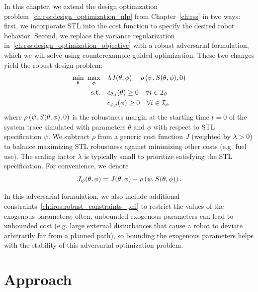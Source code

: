 In this chapter, we extend the design optimization problem~\eqref{ch:rss:design_optimization_nlp} from Chapter~\ref{ch:rss} in two ways: first, we incorporate STL into the cost function to specify the desired robot behavior. Second, we replace the variance regularization in~\eqref{ch:rss:design_optimization_objective} with a robust adversarial formulation, which we will solve using counterexample-guided optimization. These two changes yield the robust design problem:
%
\begin{subequations}\label{ch:iros:robust_nlp_generic}
	\begin{align}
		\min_\theta\ \max_\phi & \quad \lambda J(\theta, \phi) - \rho\left( \psi, S(\theta, \phi), 0 \right)  \label{ch:iros:robust_objective_generic}          \\
		\text{s.t.}            & \quad c_{\theta, i}(\theta) \geq 0 \quad \forall i \in \mathcal{I}_{\theta} \label{ch:iros:robust_constraints_theta} \\
		                       & \quad c_{\phi, i}(\phi) \geq 0 \quad \forall i \in \mathcal{I}_{\phi} \label{ch:iros:robust_constraints_phi}
	\end{align}
\end{subequations}
%
where $\rho\left( \psi, S(\theta, \phi), 0 \right)$ is the robustness margin at the starting time $t=0$ of the system trace simulated with parameters $\theta$ and $\phi$ with respect to STL specification $\psi$. We subtract $\rho$ from a generic cost function $J$ (weighted by $\lambda > 0$) to balance maximizing STL robustness against minimizing other costs (e.g. fuel use). The scaling factor $\lambda$ is typically small to prioritize satisfying the STL specification. For convenience, we denote
\begin{equation}
	J_\psi(\theta, \phi) = J(\theta, \phi) - \rho\left( \psi, S(\theta, \phi) \right).
\end{equation}

In this adversarial formulation, we also include additional constraints~\eqref{ch:iros:robust_constraints_phi} to restrict the values of the exogenous parameters; often, unbounded exogenous parameters can lead to unbounded cost (e.g. large external disturbances that cause a robot to deviate arbitrarily far from a planned path), so bounding the exogenous parameters helps with the stability of this adversarial optimization problem.

\section{Approach}

